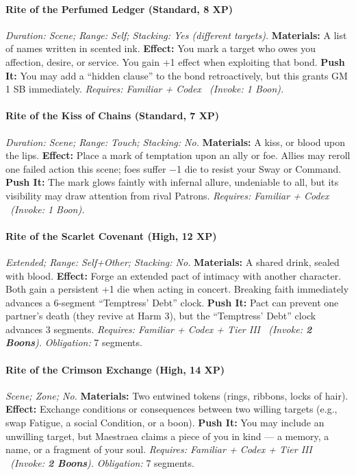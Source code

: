 \paragraph{Rite of the Perfumed Ledger (Standard, 8 XP)}  
\emph{Duration: Scene; Range: Self; Stacking: Yes (different targets).}  
\textbf{Materials:} A list of names written in scented ink.  
\textbf{Effect:} You mark a target who owes you affection, desire, or service. You gain +1 effect when exploiting that bond.  
\textbf{Push It:} You may add a “hidden clause” to the bond retroactively, but this grants GM 1 SB immediately.  
\emph{Requires: Familiar + Codex \ (\textit{Invoke:} 1 Boon).}  

\paragraph{Rite of the Kiss of Chains (Standard, 7 XP)}  
\emph{Duration: Scene; Range: Touch; Stacking: No.}  
\textbf{Materials:} A kiss, or blood upon the lips.  
\textbf{Effect:} Place a mark of temptation upon an ally or foe. Allies may reroll one failed action this scene; foes suffer −1 die to resist your Sway or Command.  
\textbf{Push It:} The mark glows faintly with infernal allure, undeniable to all, but its visibility may draw attention from rival Patrons.  
\emph{Requires: Familiar + Codex \ (\textit{Invoke:} 1 Boon).}  

\paragraph{Rite of the Scarlet Covenant (High, 12 XP)}  
\emph{Extended; Range: Self+Other; Stacking: No.}  
\textbf{Materials:} A shared drink, sealed with blood.  
\textbf{Effect:} Forge an extended pact of intimacy with another character. Both gain a persistent +1 die when acting in concert. Breaking faith immediately advances a 6-segment “Temptress’ Debt” clock.  
\textbf{Push It:} Pact can prevent one partner’s death (they revive at Harm 3), but the “Temptress’ Debt” clock advances 3 segments.  
\emph{Requires: Familiar + Codex + Tier III \ (\textit{Invoke:} \textbf{2 Boons}).}  
\emph{Obligation:} 7 segments.  

\paragraph{Rite of the Crimson Exchange (High, 14 XP)}  
\emph{Scene; Zone; No.}  
\textbf{Materials:} Two entwined tokens (rings, ribbons, locks of hair).  
\textbf{Effect:} Exchange conditions or consequences between two willing targets (e.g., swap Fatigue, a social Condition, or a boon).  
\textbf{Push It:} You may include an unwilling target, but Maestraea claims a piece of you in kind — a memory, a name, or a fragment of your soul.  
\emph{Requires: Familiar + Codex + Tier III \ (\textit{Invoke:} \textbf{2 Boons}).}  
\emph{Obligation:} 7 segments.  
